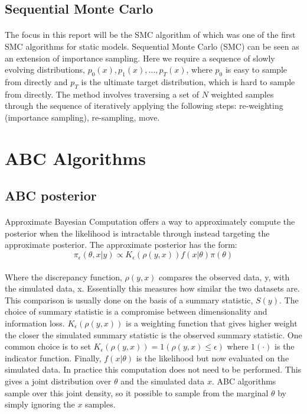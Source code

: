 \documentclass[12,fleqn]{article}
\theoremstyle{definition}
\theoremstyle{plain}
\begin{document}
\subsection{Sequential Monte Carlo}
\paragraph{}
The focus in this report will be the SMC algorithm of  which was one of the first SMC algorithms for static models.
Sequential Monte Carlo (SMC) can be seen as an extension of importance sampling.  Here we require a sequence of slowly evolving distributions, $p_0(x), p_1(x), \ldots, p_T(x)$, where $p_0$ is easy to sample from directly and $p_T$ is the ultimate target distribution, which is hard to sample from directly. The method involves traversing a set of $N$ weighted samples through the sequence of iteratively applying the following steps: re-weighting (importance sampling), re-sampling, move.
\par

\section{ABC Algorithms}
\subsection{ABC posterior}
\paragraph{}
Approximate Bayesian Computation offers a way to approximately compute the posterior when the likelihood is intractable through instead targeting the approximate posterior. The approximate posterior has the form:
\begin{equation*}
\pi_\epsilon(\theta, x|y) \propto K_\epsilon (\rho(y,x))f(x|\theta)\pi(\theta)
\end{equation*}
 
\paragraph{}
Where the discrepancy function, $\rho(y,x)$ compares the observed data, y, with the simulated data, x. Essentially this measures how similar the two datasets are. This comparison is usually done on the basis of a summary statistic, $S(y)$. The choice of summary statistic is a compromise between dimensionality and information loss. $K_\epsilon (\rho(y,x))$ is a weighting function that gives higher weight the closer the simulated summary statistic is the observed summary statistic. One common choice is to set $K_\epsilon (\rho(y,x)) = 1(\rho(y,x) \leq \epsilon)$ where $1(\cdot)$ is the indicator function. Finally, $ f(x|\theta)$ is the likelihood but now evaluated on the simulated data. In practice this computation does not need to be performed. This gives a joint distribution over $\theta$ and the simulated data $x$. ABC algorithms sample over this joint density, so it possible to sample from the marginal $\theta$ by simply ignoring the $x$ samples.
\par
\end{document}
